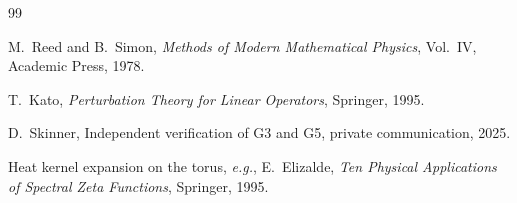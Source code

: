 \documentclass[11pt,a4paper]{amsart}
\theoremstyle{remark}
\begin{document}
\begin{thebibliography}{99}

M.~Reed and B.~Simon, \textit{Methods of Modern Mathematical Physics}, Vol.~IV, Academic Press, 1978.

T.~Kato, \textit{Perturbation Theory for Linear Operators}, Springer, 1995.

D.~Skinner, Independent verification of G3 and G5, private communication, 2025.

Heat kernel expansion on the torus, \textit{e.g.}, E.~Elizalde, \textit{Ten Physical Applications of Spectral Zeta Functions}, Springer, 1995.

\end{thebibliography}
\end{document}
